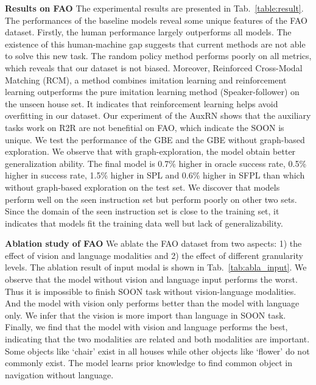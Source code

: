 \documentclass[final]{cvpr}
\begin{document}
\noindent\textbf{Results on FAO}
The experimental results are presented in Tab.~\ref{table:result}. The performances of the baseline models reveal some unique features of the FAO dataset. 
Firstly, the human performance largely outperforms all models. The existence of this human-machine gap suggests that current methods are not able to solve this new task. 
The random policy method performs poorly on all metrics, which reveals that our dataset is not biased. 
Moreover, Reinforced Cross-Modal Matching (RCM), a method combines imitation learning and reinforcement learning outperforms the pure imitation learning method (Speaker-follower) on the unseen house set. 
It indicates that reinforcement learning helps avoid overfitting in our dataset. 
Our experiment of the AuxRN shows that the auxiliary tasks work on R2R are not benefitial on FAO, which indicate the SOON is unique. 
We test the performance of the GBE and the GBE without graph-based exploration. 
We observe that with graph-exploration, the model obtain better generalization ability. The final model is 0.7\% higher in oracle success rate, 0.5\% higher in success rate, 1.5\% higher in SPL and 0.6\% higher in SFPL than which without graph-based exploration on the test set. 
We discover that models perform well on the seen instruction set but perform poorly on other two sets. 
Since the domain of the seen instruction set is close to the training set, it indicates that models fit the training data well but lack of generalizability. 

\noindent\textbf{Ablation study of FAO}
We ablate the FAO dataset from two aspects: 1) the effect of vision and language modalities and 2) the effect of different granularity levels. 
The ablation result of input modal is shown in Tab.~\ref{tab:abla_input}. 
We observe that the model without vision and language input performs the worst. 
Thus it is impossible to finish SOON task without vision-language modalities. And the model with vision only performs better than the model with language only. 
We infer that the vision is more import than language in SOON task. Finally, we find that the model with vision and language performs the best, indicating that the two modalities are related and both modalities are important. 
Some objects like `chair' exist in all houses while other objects like `flower' do not commonly exist.  The model learns prior knowledge to find common object in navigation without language. 
\end{document}
